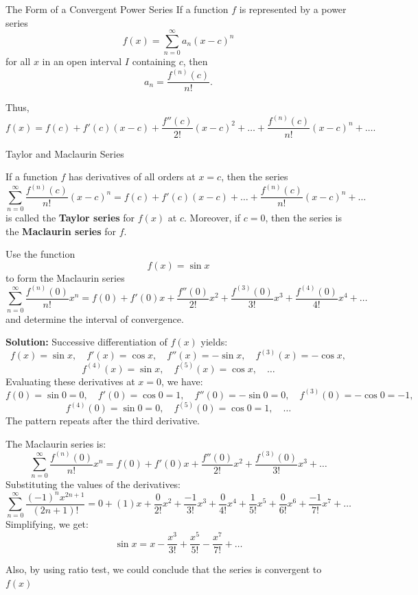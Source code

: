 \documentclass[12pt]{article}
\theoremstyle{beautifulthm}
\begin{document}
\begin{mytheorem}{The Form of a Convergent Power Series}{}
    If a function $f$ is represented by a power series 
\[
f(x) = \sum_{n=0}^\infty a_n (x-c)^n
\]
for all $x$ in an open interval $I$ containing $c$, then 
\[
a_n = \frac{f^{(n)}(c)}{n!}.
\]

Thus, 
\[
f(x) = f(c) + f'(c)(x-c) + \frac{f''(c)}{2!}(x-c)^2 + \dots + \frac{f^{(n)}(c)}{n!}(x-c)^n + \dots.
\]

\end{mytheorem}


\begin{Definition}{Taylor and Maclaurin Series}{}

If a function $f$ has derivatives of all orders at $x=c$, then the series 
\[
\sum_{n=0}^\infty \frac{f^{(n)}(c)}{n!}(x-c)^n = f(c) + f'(c)(x-c) + \dots + \frac{f^{(n)}(c)}{n!}(x-c)^n + \dots
\]
is called the \textbf{Taylor series} for $f(x)$ at $c$. Moreover, if $c=0$, then the series is the \textbf{Maclaurin series} for $f$.
\end{Definition}

\begin{tcolorbox}[colback=examplebg, colframe=red!75!black, title=\textbf{EXAMPLE 1: Forming a Power Series}, fonttitle=\bfseries, sharp corners]

Use the function 
\[
f(x) = \sin x
\]
to form the Maclaurin series 
\[
\sum_{n=0}^\infty \frac{f^{(n)}(0)}{n!}x^n = f(0) + f'(0)x + \frac{f''(0)}{2!}x^2 + \frac{f^{(3)}(0)}{3!}x^3 + \frac{f^{(4)}(0)}{4!}x^4 + \dots
\]
and determine the interval of convergence.

\tcblower
\textbf{Solution:} 
Successive differentiation of $f(x)$ yields:
\[
f(x) = \sin x, \quad f'(x) = \cos x, \quad f''(x) = -\sin x, \quad f^{(3)}(x) = -\cos x,
\]
\[
f^{(4)}(x) = \sin x, \quad f^{(5)}(x) = \cos x, \quad \dots
\]
Evaluating these derivatives at $x = 0$, we have:
\[
f(0) = \sin 0 = 0, \quad f'(0) = \cos 0 = 1, \quad f''(0) = -\sin 0 = 0, \quad f^{(3)}(0) = -\cos 0 = -1,
\]
\[
f^{(4)}(0) = \sin 0 = 0, \quad f^{(5)}(0) = \cos 0 = 1, \quad \dots
\]
The pattern repeats after the third derivative.

The Maclaurin series is:
\[
\sum_{n=0}^\infty \frac{f^{(n)}(0)}{n!}x^n = f(0) + f'(0)x + \frac{f''(0)}{2!}x^2 + \frac{f^{(3)}(0)}{3!}x^3 + \dots
\]
Substituting the values of the derivatives:
\[
\sum_{n=0}^\infty \frac{(-1)^n x^{2n+1}}{(2n+1)!} = 0 + (1)x + \frac{0}{2!}x^2 + \frac{-1}{3!}x^3 + \frac{0}{4!}x^4 + \frac{1}{5!}x^5 + \frac{0}{6!}x^6 + \frac{-1}{7!}x^7 + \dots
\]
Simplifying, we get:
\[
\sin x = x - \frac{x^3}{3!} + \frac{x^5}{5!} - \frac{x^7}{7!} + \dots
\]

Also, by using ratio test, we could conclude that the series is convergent to $f(x)$
\end{tcolorbox}
\end{document}
